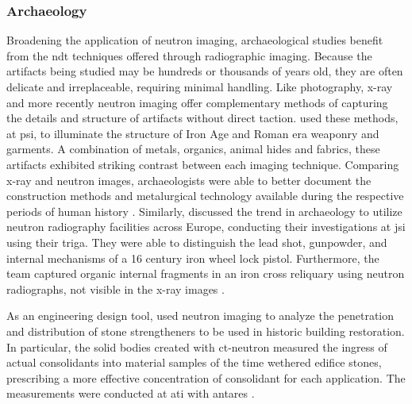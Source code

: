 \documentclass[../../../main.tex]{subfiles}%
\begin{document}
%
    \subsubsection{Archaeology}%
    \label{sec:chapter-1:motivation:archaeology}%
    Broadening the application of neutron imaging, archaeological studies benefit from the \gls{ndt} techniques offered through radiographic imaging. 
    Because the artifacts being studied may be hundreds or thousands of years old, they are often delicate and irreplaceable, requiring minimal handling.
    Like photography, \gls{x-ray} and more recently neutron imaging offer complementary methods of capturing the details and structure of artifacts without direct taction.  
    \citeauthor*{Deschler-erb_2004} used these methods, at \gls{psi}, to illuminate the structure of Iron Age and Roman era weaponry and garments.
    A combination of metals, organics, animal hides and fabrics, these artifacts exhibited striking contrast between each imaging technique.
    Comparing \gls{x-ray} and neutron images, archaeologists were able to better document the construction methods and metalurgical technology available during the respective periods of human history \cite{Deschler-erb_2004}.
    Similarly, \citeauthor*{Rant_2006} discussed the trend in archaeology to utilize neutron radiography facilities across Europe, conducting their investigations at \gls{jsi} using their \gls{triga}.
    They were able to distinguish the lead shot, gunpowder, and internal mechanisms of a \SI{16}{\thsuper} century iron wheel lock pistol. 
    Furthermore, the team captured organic internal fragments in an iron cross reliquary using neutron radiographs, not visible in the \gls{x-ray} images \cite{Rant_2006}.
    \par%
    As an engineering design tool, \citeauthor*{Hameed_2009} used neutron imaging to analyze the penetration and distribution of stone strengtheners to be used in historic building restoration.
    In particular, the solid bodies created with \gls{ct-neutron} measured the ingress of actual consolidants into material samples of the time wethered edifice stones, prescribing a more effective concentration of consolidant for each application.
    The measurements were conducted at \gls{ati} with \gls{antares} \cite{Hameed_2009, Schulz_2015}.
\end{document}
